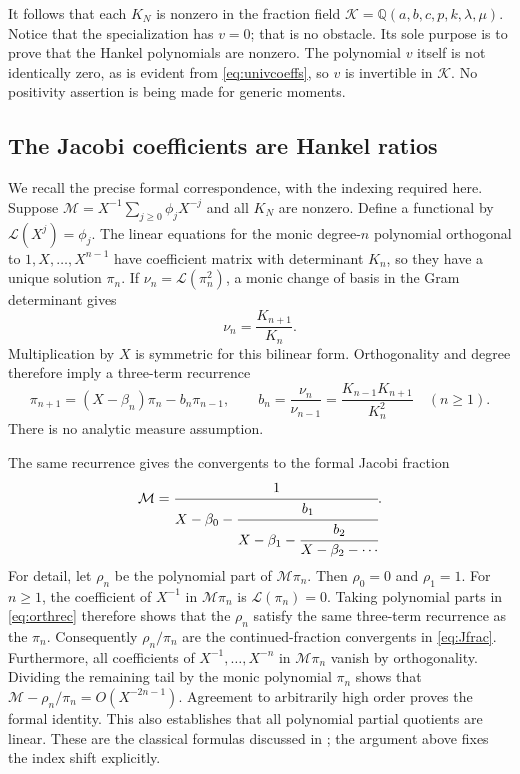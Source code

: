 \documentclass[11pt,a4paper]{article}
\numberwithin{equation}{section}
\theoremstyle{definition}
\newcommand{\Q}{\mathbb Q}
\begin{document}
It follows that each $K_N$ is nonzero in the fraction field
$\mathcal K=\Q(a,b,c,p,k,\lambda,\mu)$. Notice that the specialization has
$v=0$; that is no obstacle. Its sole purpose is to prove that the Hankel
polynomials are nonzero. The polynomial $v$ itself is not identically zero,
as is evident from \eqref{eq:univcoeffs}, so $v$ is invertible in $\mathcal K$.
No positivity assertion is being made for generic moments.

\subsection{The Jacobi coefficients are Hankel ratios}
We recall the precise formal correspondence, with the indexing required here.
Suppose $\mathcal M=X^{-1}\sum_{j\geq0}\phi_jX^{-j}$ and all $K_N$ are nonzero.
Define a functional by $\mathcal L(X^j)=\phi_j$. The linear equations for the
monic degree-$n$ polynomial orthogonal to $1,X,\ldots,X^{n-1}$ have coefficient
matrix with determinant $K_n$, so they have a unique solution $\pi_n$.
If $\nu_n=\mathcal L(\pi_n^2)$, a monic change of basis in the Gram determinant
gives
\[
 \nu_n=\frac{K_{n+1}}{K_n}.
\]
Multiplication by $X$ is symmetric for this bilinear form. Orthogonality and
degree therefore imply a three-term recurrence
\begin{equation}\label{eq:orthrec}
 \pi_{n+1}=(X-\beta_n)\pi_n-b_n\pi_{n-1},\qquad
 b_n=\frac{\nu_n}{\nu_{n-1}}
     =\frac{K_{n-1}K_{n+1}}{K_n^2}\quad(n\geq1).
\end{equation}
There is no analytic measure assumption.

The same recurrence gives the convergents to the formal Jacobi fraction
\begin{equation}\label{eq:Jfrac}
 \mathcal M=
 \cfrac{1}{X-\beta_0-
   \cfrac{b_1}{X-\beta_1-
   \cfrac{b_2}{X-\beta_2-\cdots}}}.
\end{equation}
For detail, let $\rho_n$ be the polynomial part of $\mathcal M\pi_n$.
Then $\rho_0=0$ and $\rho_1=1$. For $n\geq1$, the coefficient of $X^{-1}$
in $\mathcal M\pi_n$ is $\mathcal L(\pi_n)=0$. Taking polynomial parts in
\eqref{eq:orthrec} therefore shows that the $\rho_n$ satisfy the same
three-term recurrence as the $\pi_n$. Consequently $\rho_n/\pi_n$ are the
continued-fraction convergents in \eqref{eq:Jfrac}.
Furthermore, all coefficients of $X^{-1},\ldots,X^{-n}$ in
$\mathcal M\pi_n$ vanish by orthogonality. Dividing the remaining tail by
the monic polynomial $\pi_n$ shows that
$\mathcal M-\rho_n/\pi_n=O(X^{-2n-1})$.
Agreement to arbitrarily high order proves the formal identity.
This also establishes that all polynomial partial quotients are linear.
These are the classical formulas discussed in \cite[Theorem 4.1]{Hone2021};
the argument above fixes the index shift explicitly.
\end{document}
